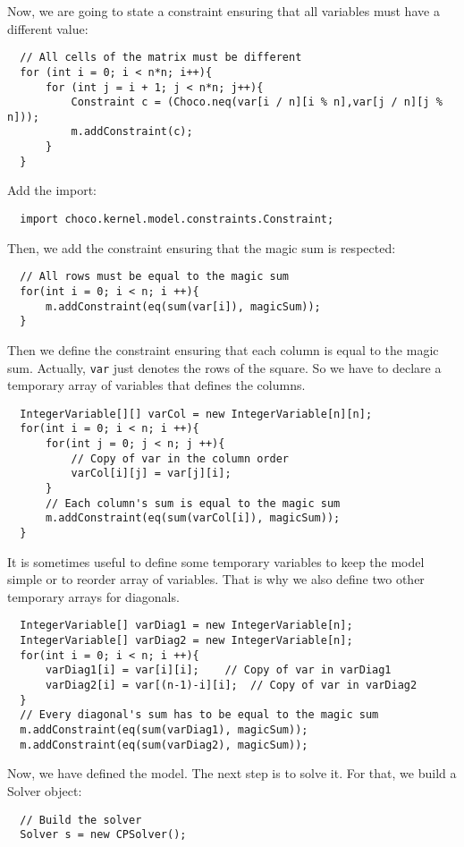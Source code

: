 \noindent Now, we are going to state a constraint ensuring that all variables must have a different value:
\begin{lstlisting}
  // All cells of the matrix must be different
  for (int i = 0; i < n*n; i++){
      for (int j = i + 1; j < n*n; j++){
	      Constraint c = (Choco.neq(var[i / n][i % n],var[j / n][j % n]));
	      m.addConstraint(c);
      }
  }
\end{lstlisting}
Add the import:
\begin{lstlisting}
  import choco.kernel.model.constraints.Constraint;
\end{lstlisting}
Then, we add the constraint ensuring that the magic sum is respected:
\begin{lstlisting}
  // All rows must be equal to the magic sum
  for(int i = 0; i < n; i ++){
	  m.addConstraint(eq(sum(var[i]), magicSum));
  }
\end{lstlisting}
Then we define the constraint ensuring that each column is equal to the magic sum.
Actually, \texttt{var} just denotes the rows of the square. So we have to declare a temporary array of variables that defines the columns.
\begin{lstlisting}
  IntegerVariable[][] varCol = new IntegerVariable[n][n];
  for(int i = 0; i < n; i ++){
	  for(int j = 0; j < n; j ++){
          // Copy of var in the column order
          varCol[i][j] = var[j][i];
	  }
	  // Each column's sum is equal to the magic sum
	  m.addConstraint(eq(sum(varCol[i]), magicSum));
  }
\end{lstlisting}
It is sometimes useful to define some temporary variables to keep the model simple or to reorder array of variables. That is why we also define two other temporary arrays for diagonals.
\begin{lstlisting}
  IntegerVariable[] varDiag1 = new IntegerVariable[n];
  IntegerVariable[] varDiag2 = new IntegerVariable[n];
  for(int i = 0; i < n; i ++){
	  varDiag1[i] = var[i][i];	  // Copy of var in varDiag1
	  varDiag2[i] = var[(n-1)-i][i];  // Copy of var in varDiag2
  }
  // Every diagonal's sum has to be equal to the magic sum
  m.addConstraint(eq(sum(varDiag1), magicSum));
  m.addConstraint(eq(sum(varDiag2), magicSum));
\end{lstlisting}
Now, we have defined the model. The next step is to solve it.
For that, we build a Solver object:
\begin{lstlisting}
  // Build the solver
  Solver s = new CPSolver();
\end{lstlisting}

